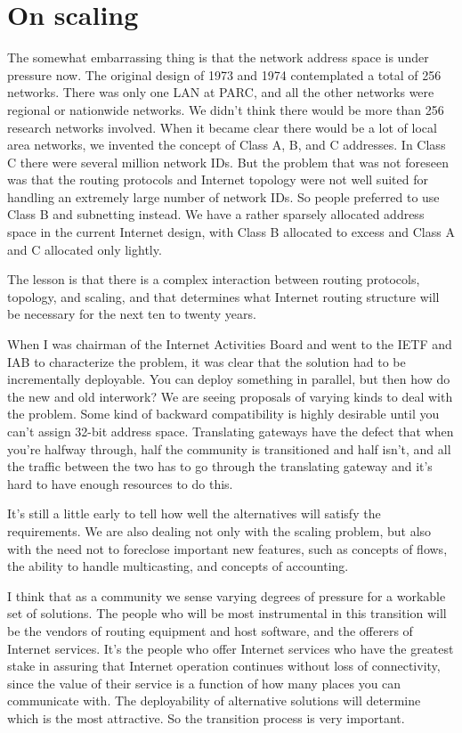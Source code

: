 \documentclass[10pt,a4paper]{scrartcl}
\begin{document}
{\section {On scaling}}

The somewhat embarrassing thing is that the network address space is under pressure now. The original design of 1973 and 1974 contemplated a total of 256 networks. There was only one LAN at PARC, and all the other networks were regional or nationwide networks. We didn't think there would be more than 256 research networks involved. When it became clear there would be a lot of local area networks, we invented the concept of Class A, B, and C addresses. In Class C there were several million network IDs. But the problem that was not foreseen was that the routing protocols and Internet topology were not well suited for handling an extremely large number of network IDs. So people preferred to use Class B and subnetting instead. We have a rather sparsely allocated address space in the current Internet design, with Class B allocated to excess and Class A and C allocated only lightly.

The lesson is that there is a complex interaction between routing protocols, topology, and scaling, and that determines what Internet routing structure will be necessary for the next ten to twenty years.

When I was chairman of the Internet Activities Board and went to the IETF and IAB to characterize the problem, it was clear that the solution had to be incrementally deployable. You can deploy something in parallel, but then how do the new and old interwork? We are seeing proposals of varying kinds to deal with the problem. Some kind of backward compatibility is highly desirable until you can't assign 32-bit address space. Translating gateways have the defect that when you're halfway through, half the community is transitioned and half isn't, and all the traffic between the two has to go through the translating gateway and it's hard to have enough resources to do this.

It's still a little early to tell how well the alternatives will satisfy the requirements. We are also dealing not only with the scaling problem, but also with the need not to foreclose important new features, such as concepts of flows, the ability to handle multicasting, and concepts of accounting.

I think that as a community we sense varying degrees of pressure for a workable set of solutions. The people who will be most instrumental in this transition will be the vendors of routing equipment and host software, and the offerers of Internet services. It's the people who offer Internet services who have the greatest stake in assuring that Internet operation continues without loss of connectivity, since the value of their service is a function of how many places you can communicate with. The deployability of alternative solutions will determine which is the most attractive. So the transition process is very important.
\end{document}
